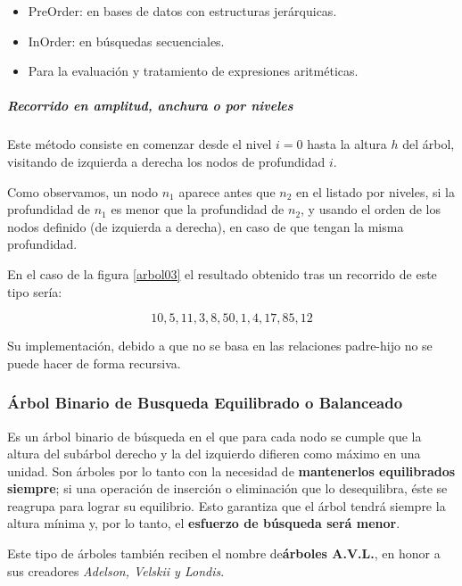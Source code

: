 \documentclass[a4paper, 11pt, titlepage]{article}
\begin{document}
            \begin{itemize}
                \item PreOrder: en bases de datos con estructuras jerárquicas.
                \item InOrder: en búsquedas secuenciales.
                \item Para la evaluación y tratamiento de expresiones aritméticas.
            \end{itemize}

            \subparagraph{Recorrido en amplitud, anchura o por niveles} Este método consiste en comenzar 
            desde el nivel $i=0$ hasta la altura $h$ del árbol, visitando de izquierda a derecha los nodos 
            de profundidad $i$.

            Como observamos, un nodo $n_1$ aparece antes 
            que $n_2$ en el listado por niveles, si la 
            profundidad de $n_1$ es menor que la profundidad de $n_2$, y usando el orden de los nodos definido 
            (de izquierda a derecha), en caso de que tengan la misma profundidad.

            En el caso de la figura \ref{arbol03} el resultado obtenido tras un recorrido de este tipo 
            sería:

            \[ 10, 5, 11, 3, 8, 50, 1, 4, 17, 85, 12 \]

            Su implementación, debido a que no se basa en las relaciones padre-hijo no se puede hacer de forma 
            recursiva.


        \subsubsection{Árbol Binario de Busqueda Equilibrado o Balanceado}

            Es un árbol binario de búsqueda en el que para cada nodo se cumple que la altura del subárbol 
            derecho y la del izquierdo difieren como máximo en una unidad. Son árboles por lo tanto con 
            la necesidad de \textbf{mantenerlos equilibrados siempre}; si una operación de inserción o 
            eliminación que lo desequilibra, éste se reagrupa para lograr su equilibrio. Esto garantiza 
            que el árbol tendrá siempre la altura mínima y, por lo tanto, el \textbf{esfuerzo de búsqueda 
            será menor}.

            Este tipo de árboles también reciben el nombre de\textbf{árboles A.V.L.}, en honor a sus creadores 
            \textit{Adelson, Velskii y Londis}.
\end{document}

